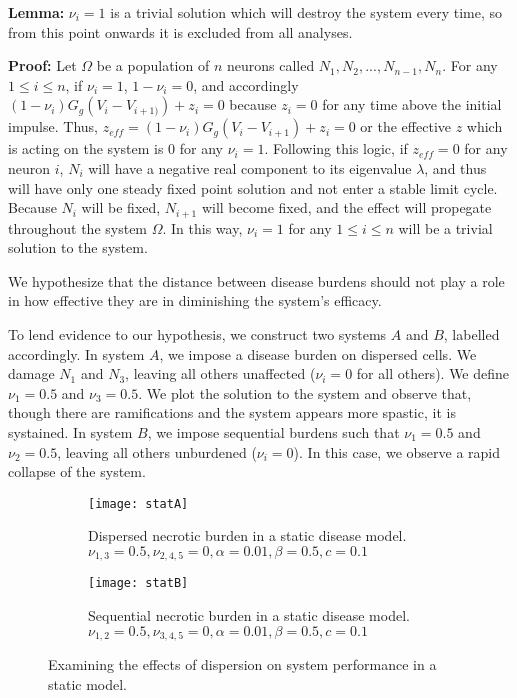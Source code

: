 \documentclass[11pt]{report}
\begin{document}
\textbf{Lemma:} $\nu_i=1$ is a trivial solution which will destroy the system every time, so from this point onwards it is excluded from all analyses.

\textbf{Proof:} Let $\Omega$ be a population of $n$ neurons called $N_1, N_2, ..., N_{n-1}, N_n$. For any $1 \leq i \leq n$, if $\nu_i=1$, $1-\nu_i=0$, and accordingly $(1-\nu_i) G_g(V_i-V_{i+1)}) + z_i=0$ because $z_i=0$ for any time above the initial impulse. Thus, $z_{eff} = (1-\nu_i) G_g(V_i-V_{i+1}) + z_i = 0$ or the effective $z$ which is acting on the system is $0$ for any $\nu_i=1$. Following this logic, if $z_{eff}=0$ for any neuron $i$, $N_i$ will have a negative real component to its eigenvalue $\lambda$, and thus will have only one steady fixed point solution and not enter a stable limit cycle. Because $N_i$ will be fixed, $N_{i+1}$ will become fixed, and the effect will propegate throughout the system $\Omega$. In this way, $\nu_i=1$ for any $1 \leq i \leq n$ will be a trivial solution to the system.

We hypothesize that the distance between disease burdens should not play a role in how effective they are in diminishing the system's efficacy. 

To lend evidence to our hypothesis, we construct two systems $A$ and $B$, labelled accordingly. In system $A$, we impose a disease burden on dispersed cells. We damage $N_1$ and $N_3$, leaving all others unaffected ($\nu_i = 0$ for all others). We define $\nu_1 = 0.5$ and $\nu_3 = 0.5$. We plot the solution to the system and observe that, though there are ramifications and the system appears more spastic, it is systained. In system $B$, we impose sequential burdens such that $\nu_1 = 0.5$ and $\nu_2 = 0.5$, leaving all others unburdened ($\nu_i = 0$). In this case, we observe a rapid collapse of the system. 


\begin{figure}
    \centering
    \begin{subfigure}[b]{0.48\textwidth}
        \texttt{[image: statA]}
        \caption{Dispersed necrotic burden in a static disease model. $\nu_{1,3} = 0.5, \nu_{2,4,5} = 0, \alpha = 0.01, \beta = 0.5,c = 0.1$}
        \label{fig:statA}
    \end{subfigure}
    \hfill %
    \begin{subfigure}[b]{0.48\textwidth}
        \texttt{[image: statB]}
        \caption{Sequential necrotic burden in a static disease model. $\nu_{1,2} = 0.5, \nu_{3,4,5} = 0, \alpha = 0.01, \beta = 0.5,c = 0.1$}
        \label{fig:statB}
    \end{subfigure}
    \caption{Examining the effects of dispersion on system performance in a static model. }\label{fig:dispersion}
\end{figure}
\end{document}
